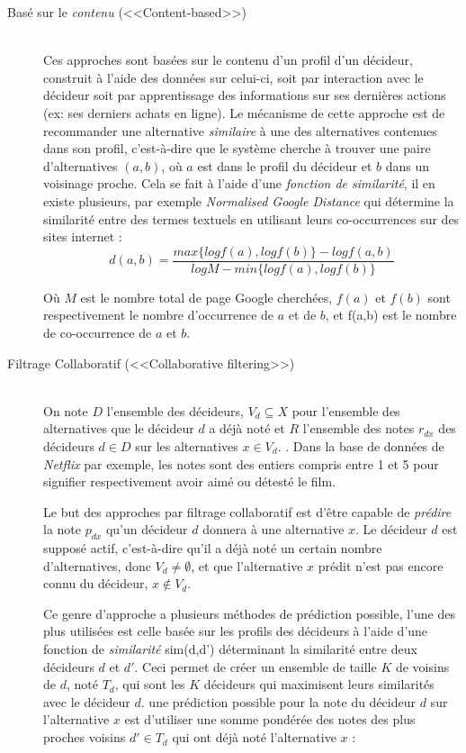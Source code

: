 \documentclass[a4paper, 11pt]{article}
\begin{document}
\begin{description}
 
\item [Basé sur le \textit{contenu} (<<Content-based>>)]\hfill \\
Ces approches sont basées sur le contenu d'un profil d'un décideur, construit à l'aide des données sur celui-ci, soit par interaction avec le décideur soit par apprentissage des informations sur ses dernières actions (ex: ses derniers achats en ligne). Le mécanisme de cette approche est de recommander une alternative \textit{similaire} à une des alternatives contenues dans son profil, c'est-à-dire que le système cherche à trouver une paire d'alternatives $(a,b)$, où $a$ est dans le profil du décideur et $b$ dans un voisinage proche. Cela se fait à l'aide d'une \textit{fonction de similarité}, il en existe plusieurs, par exemple \textit{Normalised Google Distance} qui détermine la similarité entre des termes textuels en utilisant leurs co-occurrences sur des sites internet :\\
\begin{equation}
	d(a,b) = \frac{max \{log f(a), log f(b)\} - log f(a,b)}{log M - min \{log f(a), log f(b)\}}
\end{equation}

Où $M$ est le nombre total de page Google cherchées, $f(a)$ et $f(b)$ sont respectivement le nombre d'occurrence de $a$ et de $b$, et f(a,b) est le nombre de co-occurrence de $a$ et $b$.\\

\item [Filtrage Collaboratif (<<Collaborative filtering>>)] \hfill \\
On note $D$ l'ensemble des décideurs, $V_d \subseteq X$ pour l'ensemble des alternatives que le décideur $d$ a déjà noté et $R$ l'ensemble des notes $r_{dx}$ des décideurs $d \in D$ sur les alternatives $x \in V_d$. .
Dans la base de données de \textit{Netflix} par exemple, les notes sont des entiers compris entre 1 et 5 pour signifier respectivement avoir aimé ou détesté le film.

\quad Le but des approches par filtrage collaboratif est d’être capable de \textit{prédire} la note $p_{dx}$ qu'un décideur $d$ donnera à une alternative $x$. Le décideur $d$ est supposé actif, c'est-à-dire qu'il a déjà noté un certain nombre d'alternatives, donc $V_d \neq \emptyset$, et que l'alternative $x$ prédit n'est pas encore connu du décideur, $x \notin V_d$.

\quad Ce genre d'approche a plusieurs méthodes de prédiction possible, l'une des plus utilisées est celle basée sur les profils des décideurs à l'aide d'une fonction de \textit{similarité} sim(d,d') déterminant la similarité entre deux décideurs $d$ et $d'$. Ceci permet de créer un ensemble de taille $K$ de voisins de $d$, noté $T_d$, qui sont les $K$ décideurs qui maximisent leurs similarités avec le décideur $d$. une prédiction possible pour la note du décideur $d$ sur l'alternative $x$ est d'utiliser une somme pondérée des notes des plus proches voisins $d' \in T_d$ qui ont déjà noté l'alternative $x$ :


\end{description}
\end{document}
